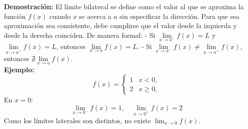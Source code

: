\textbf{Demostración:}  
El límite bilateral se define como el valor al que se aproxima la función $f(x)$ cuando $x$ se acerca a $a$ sin especificar la dirección.  
Para que esa aproximación sea consistente, debe cumplirse que el valor desde la izquierda y desde la derecha coinciden.  
De manera formal:  
- Si $\lim\limits_{x \to a^-} f(x) = L$ y $\lim\limits_{x \to a^+} f(x) = L$, entonces $\lim\limits_{x \to a} f(x) = L$.  
- Si $\lim\limits_{x \to a^-} f(x) \neq \lim\limits_{x \to a^+} f(x)$, entonces $\nexists \lim\limits_{x \to a} f(x)$.\\

\textbf{Ejemplo:}  
\[
f(x) =
\begin{cases}
1 & x < 0, \\
2 & x \geq 0,
\end{cases}
\]
En $x=0$:  
\[
\lim_{x \to 0^-} f(x) = 1, \quad \lim_{x \to 0^+} f(x) = 2
\]
Como los límites laterales son distintos, no existe \(\lim_{x \to 0} f(x)\).

